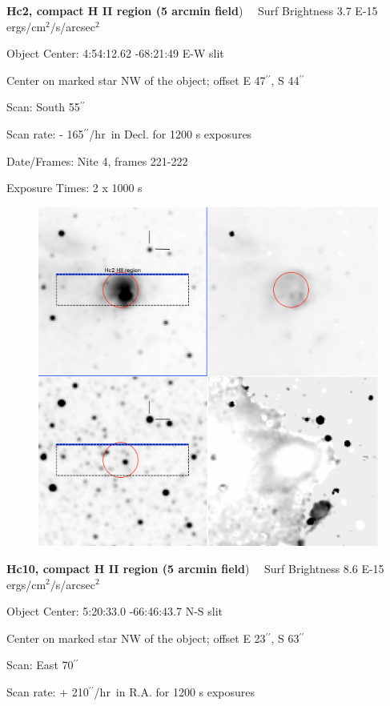 \documentclass[11pt]{article}
\newcommand{\arcsec}{$^{\prime\prime}$}
\begin{document}
\newpage 
 
 
{\bf Hc2, compact H II region (5 arcmin field})   \ \   Surf Brightness 3.7 E-15 ergs/cm$^2/$s/arcsec$^2$

Object Center:  4:54:12.62   -68:21:49   E-W slit

Center on marked star NW of the object; offset E 47\arcsec,  S 44\arcsec

Scan:  South 55\arcsec

Scan rate:  - 165\arcsec/hr\ in Decl. for 1200 s exposures

Date/Frames:  Nite 4, frames 221-222

Exposure Times:  2 x 1000 s

\begin{figure}
\includegraphics[width=12.5cm]{snapshots/Hc2_HII_5arcmin.png}
\end{figure}

\newpage 
 
{\bf Hc10, compact H II region (5 arcmin field})   \ \   Surf Brightness 8.6 E-15 ergs/cm$^2/$s/arcsec$^2$

Object Center:  5:20:33.0    -66:46:43.7   N-S slit

Center on marked star NW of the object; offset E 23\arcsec,  S 63\arcsec

Scan:    East 70\arcsec

Scan rate:  + 210\arcsec/hr\ in R.A. for 1200 s exposures
\end{document}
